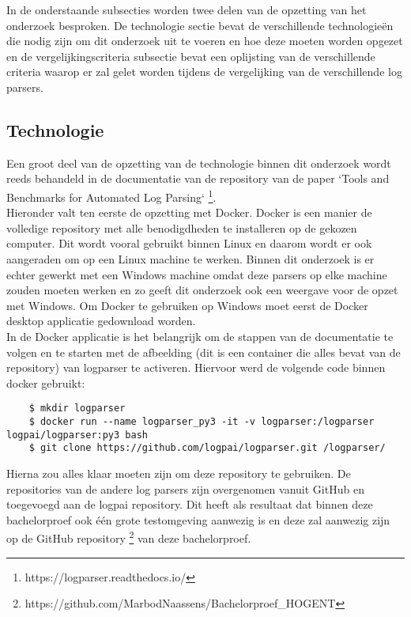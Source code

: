In de onderstaande subsecties worden twee delen van de opzetting van het onderzoek besproken. De technologie sectie bevat de verschillende technologieën die nodig zijn om dit onderzoek uit te voeren en hoe deze moeten worden opgezet en de vergelijkingscriteria subsectie bevat een oplijsting van de verschillende criteria waarop er zal gelet worden tijdens de vergelijking van de verschillende log parsers.

\subsection{Technologie}
\label{section:Technologie}
Een groot deel van de opzetting van de technologie binnen dit onderzoek wordt reeds behandeld in de documentatie van de repository van de paper `Tools and Benchmarks for Automated Log Parsing` \autocite{TBA2019} \footnote{https://logparser.readthedocs.io/}.\\

Hieronder valt ten eerste de opzetting met Docker. Docker is een manier de volledige repository met alle benodigdheden te installeren op de gekozen computer. Dit wordt vooral gebruikt binnen Linux en daarom wordt er ook aangeraden om op een Linux machine te werken. Binnen dit onderzoek is er echter gewerkt met een Windows machine omdat deze parsers op elke machine zouden moeten werken en zo geeft dit onderzoek ook een weergave voor de opzet met Windows. Om Docker te gebruiken op Windows moet eerst de Docker desktop applicatie gedownload worden.\\

In de Docker applicatie is het belangrijk om de stappen van de documentatie te volgen en te starten met de afbeelding (dit is een container die alles bevat van de repository) van logparser te activeren. Hiervoor werd de volgende code binnen docker gebruikt:
\begin{verbatim}
    $ mkdir logparser
    $ docker run --name logparser_py3 -it -v logparser:/logparser logpai/logparser:py3 bash
    $ git clone https://github.com/logpai/logparser.git /logparser/
\end{verbatim}

Hierna zou alles klaar moeten zijn om deze repository te gebruiken. De repositories van de andere log parsers zijn overgenomen vanuit GitHub en toegevoegd aan de logpai repository. Dit heeft als resultaat dat binnen deze bachelorproef ook één grote testomgeving aanwezig is en deze zal aanwezig zijn op de GitHub repository \footnote{https://github.com/MarbodNaassens/Bachelorproef\_HOGENT} van deze bachelorproef.

